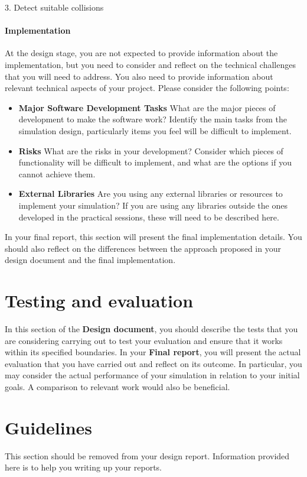 \documentclass[conference,backref=page]{acmsiggraph}
\begin{document}
3. Detect suitable collisions
\paragraph{Implementation}
At the design stage, you are not expected to provide information about the implementation, but you need to consider and reflect on the technical challenges that you will need to address. You also need to provide information about relevant technical aspects of your project. Please consider the following points:

\begin{itemize}
\item  {\bf Major Software Development Tasks} What are the major pieces of development to make the software work?  Identify the main tasks from the simulation design, particularly items you feel will be difficult to implement. 
\item {\bf Risks} What are the risks in your development?  Consider which pieces of functionality will be difficult to implement, and what are the options if you cannot achieve them.
\item {\bf External Libraries} Are you using any external libraries or resources to implement your simulation?  If you are using any libraries outside the ones developed in the practical sessions, these will need to be described here.
\end{itemize}

In your final report, this section will present the final implementation details. You should also reflect on the differences between the approach proposed in your design document and the final implementation.

\section{Testing and evaluation}
In this section of the {\bf Design document}, you should describe the tests that you are considering carrying out to test your evaluation and ensure that it works within its specified boundaries. In your {\bf Final report}, you will present the actual evaluation that you have carried out and reflect on its outcome. In particular, you may consider the actual performance of your simulation in relation to your initial goals. A comparison to relevant work would also be beneficial.

\section{Guidelines}
This section should be removed from your design report. Information provided here is to help you writing up your reports.
\end{document}
